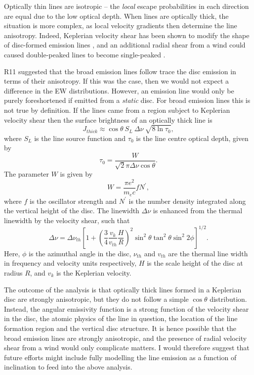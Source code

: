 Optically thin lines are isotropic -- the {\em local}
escape probabilities in each direction are equal due to the 
low optical depth. 
When lines are optically thick, the situation is more
complex, as local velocity gradients then determine the line 
anisotropy. Indeed, Keplerian velocity shear has been shown to modify the
shape of disc-formed emission lines \citep{hornemarsh1986}, and an additional
radial shear from a wind could caused double-peaked lines
to become single-peaked \citep{MC96,MC97,flohic2012}.

R11 suggested that the broad emission lines follow trace the disc
emission in terms of their anisotropy. 
If this was the case, then we would not expect a difference in the EW 
distributions. However, an emission line would only be purely 
foreshortened if emitted from a {\em static} disc. For broad emission lines
this is not true by definition. If the lines came from a region subject to
Keplerian velocity shear then the surface brightness of an optically thick 
line is \citep{hornemarsh1986}
\begin{equation}
J_{thick} \approx \cos \theta~S_L~\Delta \nu~\sqrt{8 \ln \tau_0},
\end{equation}
where $S_L$ is the line source function and
$\tau_0$ is the line centre optical depth, given by
\begin{equation}
\tau_0 = \frac{W}{\sqrt{2}\pi \Delta \nu \cos \theta}.
\end{equation}
The parameter $W$ is given by
\begin{equation}
W = \frac{\pi e^2}{m_e c}f N^\prime,
\end{equation}
where $f$ is the oscillator strength and $N^\prime$ is the number
density integrated along the vertical height of the disc. The linewidth
$\Delta \nu$ is enhanced from the thermal linewidth by the velocity shear, such
that
\begin{equation}
\Delta \nu = \Delta \nu_{th} \left[1 + 
\left(\frac{3}{4}\frac{v_{k}}{v_{th}}\frac{H}{R}\right)^2
\sin^2 \theta \tan^2 \theta \sin^2 2 \phi
\right]^{1/2}.
\end{equation}
Here, $\phi$ is the azimuthal angle in the disc, $\nu_{th}$ and $v_{th}$ are the 
thermal line width in frequency and velocity units respectively, 
$H$ is the scale height of the disc at radius $R$, and $v_k$ is the
Keplerian velocity.

The outcome of the \cite{hornemarsh1986} analysis is that optically thick lines 
formed in a Keplerian disc are strongly anisotropic, but they do not follow a simple 
$\cos \theta$ distribution. Instead, the angular emissivity function is
a strong function of the velocity shear in the disc, the atomic physics of
the line in question, the location of the line formation region 
and the vertical disc structure. It is hence possible
that the broad emission lines are strongly anisotropic, and the presence of radial
velocity shear from a wind would only complicate matters. 
I would therefore suggest that future efforts might include fully modelling 
the line emission as a function of inclination to feed into the above analysis.

